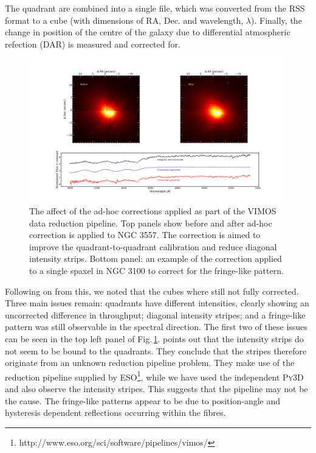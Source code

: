 		The quadrant are combined into a single file, which was converted from the RSS format to a cube (with dimensions of RA, Dec. and wavelength, $\lambda$). Finally, the change in position of the centre of the galaxy due to differential atmospheric refection (DAR) is measured and corrected for. 

		\begin{figure}
			\centering
			\includegraphics[width=0.99\textwidth]{chapter2/corr_image.png}
			\caption[Ad-hoc correction to VIMOS datacubes]{The affect of the ad-hoc corrections applied as part of the VIMOS data reduction pipeline. Top panels show before and after ad-hoc correction is applied to NGC 3557. The correction is aimed to improve the quadrant-to-quadrant calibration and reduce diagonal intensity strips. Bottom panel: an example of the correction applied to a single spaxel in NGC 3100 to correct for the fringe-like pattern.}
			\label{fig:Correction}
		\end{figure}

		Following on from this, we noted that the cubes where still not fully corrected. Three main issues remain: quadrants have different intensities, clearly showing an uncorrected difference in throughput; diagonal intensity stripes; and a fringe-like pattern was still observable in the spectral direction. The first two of these issues can be seen in the top left panel of Fig.\,\ref{fig:Correction}. \citet{Lagerholm2012} points out that the intensity strips do not seem to be bound to the quadrants. They conclude that the stripes therefore originate from an unknown reduction pipeline problem. They make use of the reduction pipeline supplied by ESO\footnote{http://www.eso.org/sci/software/pipelines/vimos/}, while we have used the independent \textsc{Py3D} and also observe the intensity stripes. This suggests that the pipeline may not be the cause. The fringe-like patterns appear to be due to position-angle and hysteresis dependent reflections occurring within the fibres. 

